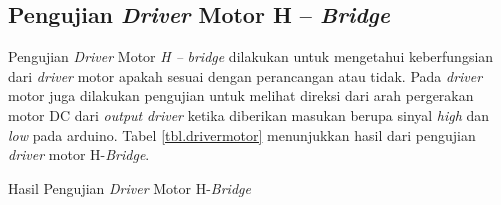 \subsection{Pengujian \textit{Driver} Motor H – \textit{Bridge}}
Pengujian \textit{Driver} Motor\textit{ H –} \textit{bridge} dilakukan untuk mengetahui keberfungsian dari \textit{driver} motor apakah sesuai dengan perancangan atau tidak. Pada \textit{driver} motor juga dilakukan pengujian untuk melihat direksi dari arah pergerakan motor DC dari \textit{output} \textit{driver} ketika diberikan masukan berupa sinyal \textit{high} dan \textit{low} pada arduino. Tabel \ref{tbl.drivermotor} menunjukkan hasil dari pengujian \textit{driver} motor H-\textit{Bridge}. 
\begin{table}[H]
	\centering
	\small
	\caption{Hasil Pengujian \textit{Driver} Motor H-\textit{Bridge}}
		\label{tbl.drivermotor}
		

\end{table}
